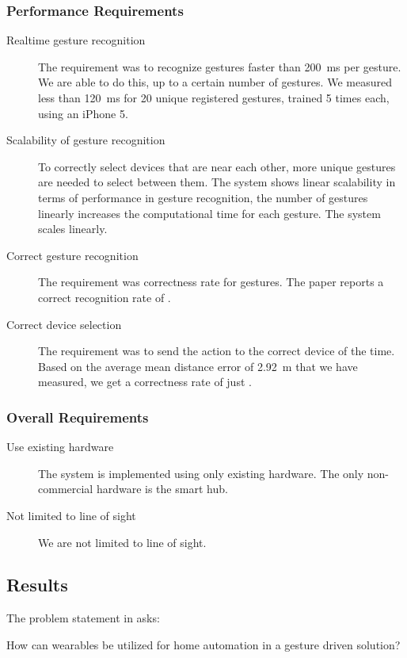 \subsubsection{Performance Requirements}
\begin{description}
  \item[\yes Realtime gesture recognition] The requirement was to recognize gestures faster than \SI{200}{\milli\second} per gesture. We are able to do this, up to a certain number of gestures. We measured less than \SI{120}{\milli\second} for \num{20} unique registered gestures, trained \num{5} times each, using an iPhone 5.
  \item[\yes Scalability of gesture recognition] To correctly select devices that are near each other, more unique gestures are needed to select between them. The system shows linear scalability in terms of performance in gesture recognition, \ie the number of gestures linearly increases the computational time for each gesture. The system scales linearly.  
  \item[\yes Correct gesture recognition] The requirement was  correctness rate for gestures. The \threedollar paper \cite{threedollar} reports a correct recognition rate of .
  \item[\no Correct device selection] The requirement was to send the action to the correct device  of the time. Based on the average mean distance error of \SI{2.92}{\meter} that we have measured, we get a correctness rate of just . 
\end{description}

\subsubsection{Overall Requirements}
\begin{description}
  \item[\yes Use existing hardware] The system is implemented using only existing hardware. The only non-commercial hardware is the smart hub. 
  \item[\yes Not limited to line of sight] We are not limited to line of sight. 
\end{description}

\subsection{Results}
The problem statement in  asks:
\begin{framed}
  How can wearables be utilized for home automation in a gesture driven solution?
\end{framed}


